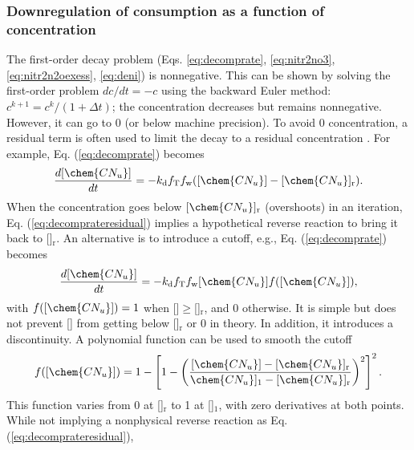 \documentclass[gmd, manuscript]{copernicus}
\begin{document}
\subsubsection{Downregulation of consumption as a function of concentration}
The first-order decay problem (Eqs. \ref{eq:decomprate}, \ref{eq:nitr2no3},
\ref{eq:nitr2n2oexess}, \ref{eq:deni}) is nonnegative. This can be shown by
solving the first-order problem $dc/dt=-c$ using the backward Euler method:
$c^{k+1}=c^k/(1+\Delta t)$; the concentration decreases but remains
nonnegative. However, it can go to 0 (or below machine precision). To avoid 0 concentration, a residual term
is often used to limit the decay to a residual concentration \citep{Tang2013a}.
For example, Eq. (\ref{eq:decomprate}) becomes
\begin{equation}
\frac{d [\chem{CN_u}]}{d t} = -k_\text{d} f_\text{T} f_\text{w}
([\chem{CN_u}] - [\chem{CN_u}]_\text{r}).
\label{eq:decomprateresidual}
\end{equation}
When the concentration goes below $[\chem{CN_u}]_\text{r}$ (overshoots) in an
iteration, Eq. (\ref{eq:decomprateresidual}) implies a hypothetical reverse
reaction to bring it back to []$_\text{r}$. An alternative is to
introduce a cutoff, e.g., Eq. (\ref{eq:decomprate}) becomes
\begin{equation}
\frac{d [\chem{CN_u}]}{d t} = -k_\text{d} f_\text{T} f_\text{w}
[\chem{CN_u}] f([\chem{CN_u}]),
\end{equation}
with $f([\chem{CN_u}]) = 1$ when []$\geq$[]$_\text{r}$,
and 0 otherwise. It is simple but does not prevent [] from getting
below []$_\text{r}$ or 0 in theory. In addition, it introduces a
discontinuity. A polynomial function can be used to smooth the cutoff 
\begin{equation}
f([\chem{CN_u} ])=1-\left[1-\left(\frac{[\chem{CN_u}]-[\chem{CN_u}
]_\text{r}}{\chem{CN_u} ]_1-[\chem{CN_u} ]_\text{r}}\right)^2 \right]^2.
\label{eq:polycutoff}
\end{equation}
This function varies from 0 at []$_\text{r}$ to 1 at
[]$_1$, with zero derivatives at both points. While not implying a
nonphysical reverse reaction as Eq. (\ref{eq:decomprateresidual}), 
\end{document}
